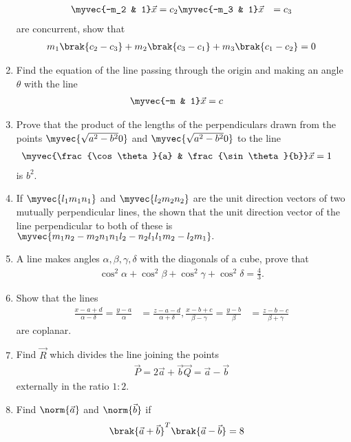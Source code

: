 \begin{enumerate}[label=\arabic*.,ref=\thesubsection.\theenumi]
\begin{align}
\myvec{-m_2 & 1}\vec{x} &= c_2

\myvec{-m_3 & 1}\vec{x} &= c_3
\end{align}
%
are concurrent, show that
%
\begin{align}
m_1\brak{c_2-c_3}+
m_2\brak{c_3-c_1}+
m_3\brak{c_1-c_2} = 0
\end{align}
%
\item Find the equation of the line passing through the origin and making an angle $\theta$ with the line %
\begin{align}
\myvec{-m & 1}\vec{x} &= c
\end{align}
%
\item Prove that the product of the lengths of the perpendiculars drawn from the points $\myvec{\sqrt{a^2-b^2}0}$ and $\myvec{\sqrt{a^2-b^2}0}$ to the line 
%
\begin{align}
\myvec{\frac{\cos\theta}{a} & \frac{\sin\theta}{b}}\vec{x} &= 1
\end{align}
%
is $b^2$.

\item If 
$
\myvec{l_1m_1n_1}
$
and
$
\myvec{l_2m_2n_2}
$
are the unit direction vectors of two mutually perpendicular lines, the shown that the unit direction vector of the line perpendicular to both of these is
$
\myvec{m_1n_2-m_2n_1n_1l_2-n_2l_1l_1m_2-l_2m_1}.
$
\item A line makes angles $\alpha, \beta, \gamma, \delta$ with the diagonals of a cube, prove that \begin{align}
\cos^2\alpha + \cos^2\beta + \cos^2\gamma +\cos^2\delta = \frac{4}{3}.
\end{align}
\item Show that the lines 
\begin{align}
\frac{x-a+d}{\alpha-\delta} = \frac{y-a}{\alpha} &= \frac{z-a-d}{\alpha+\delta}, 

\frac{x-b+c}{\beta-\gamma} = \frac{y-b}{\beta} &= \frac{z-b-c}{\beta+\gamma} 
\end{align}
%
are coplanar.
\item Find $\vec{R}$ which divides the line joining the points 
\begin{align}
\vec{P} = 2\vec{a}+\vec{b}

\vec{Q} = \vec{a}-\vec{b}
\end{align}
externally in the ratio $1:2$.
\item Find $\norm{\vec{a}}$ and $\norm{\vec{b}}$ if 
\begin{align}
\brak{\vec{a}+\vec{b}}^T\brak{\vec{a}-\vec{b}} &= 8


\end{align}
\end{enumerate}
